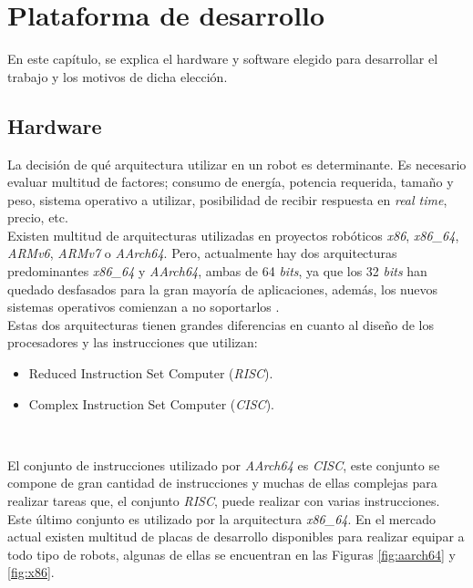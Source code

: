 \chapter{Plataforma de desarrollo}
\label{cap:capitulo3}
En este capítulo, se explica el hardware y software elegido para desarrollar el trabajo y los motivos de dicha elección.\\

\section{Hardware}
\label{sec:arquitectura}
La decisión de qué arquitectura utilizar en un robot es determinante. Es necesario evaluar multitud de factores; consumo de energía, potencia requerida, tamaño y peso, sistema operativo a utilizar, posibilidad de recibir respuesta en \textit{real time}, precio, etc.\\

Existen multitud de arquitecturas utilizadas en proyectos robóticos \textit{x86}, \textit{x86\_64}, \textit{ARMv6}, \textit{ARMv7} o \textit{AArch64}. Pero, actualmente hay dos arquitecturas predominantes \textit{x86\_64} y \textit{AArch64}, ambas de 64 \textit{bits}, ya que los 32 \textit{bits} han quedado desfasados para la gran mayoría de aplicaciones, además, los nuevos sistemas operativos comienzan a no soportarlos \cite{canonical32bits}.\\ 

Estas dos arquitecturas tienen grandes diferencias en cuanto al diseño de los procesadores y las instrucciones que utilizan:
\begin{itemize}
	\item Reduced Instruction Set Computer (\textit{RISC}).
	\item Complex Instruction Set Computer (\textit{CISC}).
\end{itemize}\

El conjunto de instrucciones utilizado por \textit{AArch64} es \textit{CISC}, este conjunto se compone de gran cantidad de instrucciones y muchas de ellas complejas para realizar tareas que, el conjunto \textit{RISC}, puede realizar con varias instrucciones. Este último conjunto es utilizado por la arquitectura \textit{x86\_64}. En el mercado actual existen multitud de placas de desarrollo disponibles para realizar equipar a todo tipo de robots, algunas de ellas se encuentran en las Figuras \ref{fig:aarch64} y \ref{fig:x86}.\\

